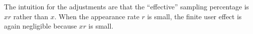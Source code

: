 \documentclass[10pt]{article}
\newcommand{\bbe}{\mathbb{E}}
\begin{document}
The intuition for the adjustments are that the ``effective'' sampling percentage is $xr$ rather than $x$. When the appearance rate $r$ is small, the finite user effect is again negligible because $xr$ is small. 


%
%
%



\end{document}
